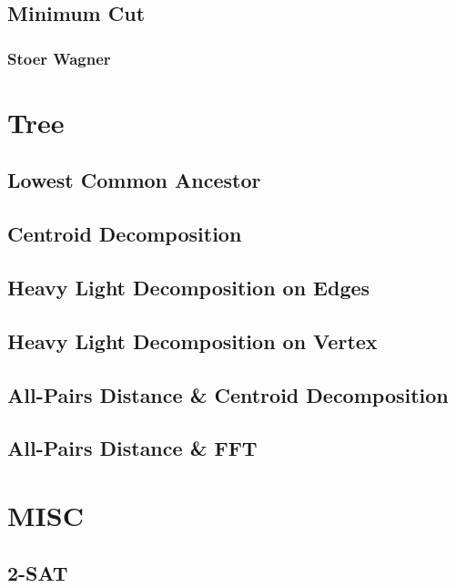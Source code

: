 \documentclass[10pt,a4paper]{report}
\begin{document}
		\subsection{Minimum Cut}
			\subsubsection{Stoer Wagner}
				
	
	\newpage
	\section{Tree}
		\subsection{Lowest Common Ancestor}
			
		\newpage
		\subsection{Centroid Decomposition}
			
		\newpage
		\subsection{Heavy Light Decomposition on Edges}
			
		\subsection{Heavy Light Decomposition on Vertex}
		\subsection{All-Pairs Distance \& Centroid Decomposition}
		\subsection{All-Pairs Distance \& FFT}
		
	\section{MISC}
		\subsection{2-SAT}
		
\end{document}
